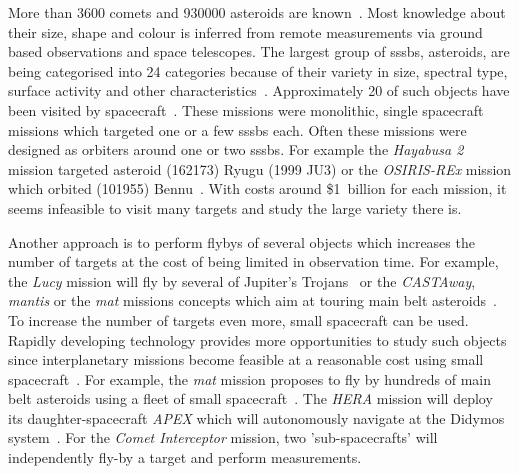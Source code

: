 More than \SI{3600}{} comets and \SI{930000}{} asteroids are known~\cite{nasaSBD_count, mpc2020}. Most knowledge about their size, shape and colour is inferred from remote measurements via ground based observations and space telescopes. The largest group of \glspl{sssb}, asteroids, are being categorised into \SI{24}{} categories because of their variety in size, spectral type, surface activity and other characteristics~\cite{demeo2009extension}. Approximately \SI{20}{} of such objects have been visited by spacecraft~\cite{nasaSBD_missions}. These missions were monolithic, single spacecraft missions which targeted one or a few \glspl{sssb} each. Often these missions were designed as orbiters around one or two \glspl{sssb}. For example the \textit{Hayabusa 2} mission targeted asteroid (162173) Ryugu (1999 JU3) or the \textit{OSIRIS-REx} mission which orbited (101955) Bennu~\cite{Watanabe2017Hayabusa2Overview, lauretta2017osiris}. With costs around \$1~billion for each mission, it seems infeasible to visit many targets and study the large variety there is.

Another approach is to perform flybys of several objects which increases the number of targets at the cost of being limited in observation time. For example, the \textit{Lucy} mission will fly by several of Jupiter's Trojans~\cite{stanbridge2017lucy} or the \textit{CASTAway}, \textit{\gls{mantis}} or the \textit{\gls{mat}} missions concepts which aim at touring main belt asteroids~\cite{bowles2018castaway, rivkin2016mainmantis}. To increase the number of targets even more, small spacecraft can be used. Rapidly developing technology provides more opportunities to study such objects since interplanetary missions become feasible at a reasonable cost using small spacecraft~\cite{Poghosyan2017CubeSatMissions, andrews2019asteroid, snodgrass2019europeanCI}. For example, the \textit{\gls{mat}} mission proposes to fly by hundreds of main belt asteroids using a fleet of small spacecraft~\cite{Slavinskis2018NanospacecraftSails}. The \textit{HERA} mission will deploy its daughter-spacecraft \textit{APEX} which will autonomously navigate at the Didymos system~\cite{Kohout2018FeasibilityStudy}. For the \textit{Comet Interceptor} mission, two 'sub-spacecrafts' will independently fly-by a target and perform measurements\cite{snodgrass2019europeanCI}.

